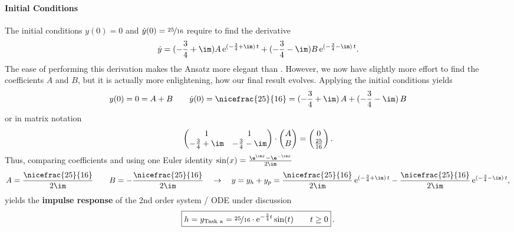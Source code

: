 \paragraph{Initial Conditions}
\label{Sec:TaskaInitCond}
The initial conditions $y(0)=0$ and $\dot{y}(0)=\nicefrac{25}{16}$ require to find
the derivative
\begin{align}
\dot{y} =
(-\frac{3}{4}+\im) A \, \mathrm{e}^{(-\frac{3}{4}+\im)\,t} +
(-\frac{3}{4}-\im) B \, \mathrm{e}^{(-\frac{3}{4}-\im)\,t}.
\end{align}
%
The ease of performing this derivation makes the Ansatz 
more elegant than .
%
However, we now have slightly more effort to find the coefficients $A$ and $B$,
but it is actually more enlightening, how our final result evolves.
%
Applying the initial conditions yields
%
\begin{align}
y(0) = 0 = A + B
\qquad
\dot{y}(0) = \nicefrac{25}{16} =
(-\frac{3}{4}+\im) \, A + (-\frac{3}{4}-\im) \, B
\end{align}
or in matrix notation
\begin{align}
	\begin{pmatrix}
		1 & 1 \\
		-\frac{3}{4}+\im & -\frac{3}{4}-\im
	\end{pmatrix}
	\cdot
	\begin{pmatrix}
		A \\
		B
	\end{pmatrix}
	=
	\begin{pmatrix}
		0 \\
		\frac{25}{16}
	\end{pmatrix}. \nonumber
\end{align}
Thus, comparing coefficients and using one Euler identity
$\sin(x) = \frac{\e^{\im x}-\e^{-\im x}}{2\im}$
\begin{align}
A = \frac{\nicefrac{25}{16}}{2\im}\qquad B = -\frac{\nicefrac{25}{16}}{2\im}
\quad\rightarrow\quad
y = y_h + y_p =
 \frac{\nicefrac{25}{16}}{2\im} \, \mathrm{e}^{(-\frac{3}{4}+\im)\,t}
-\frac{\nicefrac{25}{16}}{2\im} \, \mathrm{e}^{(-\frac{3}{4}-\im)\,t},
\end{align}
yields the \textbf{impulse response} of the 2nd order system / ODE under discussion
\begin{align}
\boxed{
h = y_\text{Task a} = \nicefrac{25}{16} \cdot \mathrm{e}^{-\frac{3}{4} t} \sin(t) \qquad t\geq0
}\,.
\end{align}



